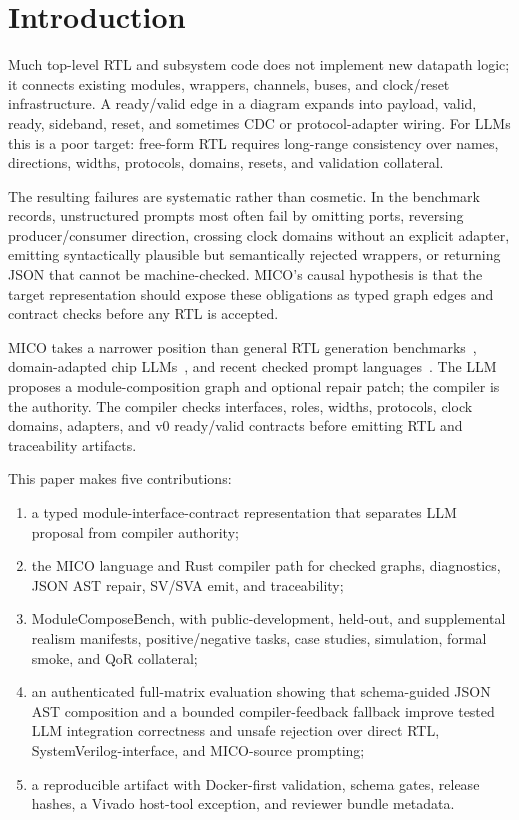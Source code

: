 \section{Introduction}

Much top-level RTL and subsystem code does not implement new datapath logic; it connects existing modules, wrappers, channels, buses, and clock/reset infrastructure. A ready/valid edge in a diagram expands into payload, valid, ready, sideband, reset, and sometimes CDC or protocol-adapter wiring. For LLMs this is a poor target: free-form RTL requires long-range consistency over names, directions, widths, protocols, domains, resets, and validation collateral.

The resulting failures are systematic rather than cosmetic. In the benchmark
records, unstructured prompts most often fail by omitting ports, reversing
producer/consumer direction, crossing clock domains without an explicit
adapter, emitting syntactically plausible but semantically rejected wrappers, or
returning JSON that cannot be machine-checked. MICO's causal hypothesis is that
the target representation should expose these obligations as typed graph edges
and contract checks before any RTL is accepted.

MICO takes a narrower position than general RTL generation benchmarks~\cite{verilogeval2023,rtlcoder2023,openllmrtl2025}, domain-adapted chip LLMs~\cite{chipnemo2023}, and recent checked prompt languages~\cite{cppl2026}. The LLM proposes a module-composition graph and optional repair patch; the compiler is the authority. The compiler checks interfaces, roles, widths, protocols, clock domains, adapters, and v0 ready/valid contracts before emitting RTL and traceability artifacts.

This paper makes five contributions:

\begin{enumerate}
  \item a typed module-interface-contract representation that separates LLM proposal from compiler authority;
  \item the MICO language and Rust compiler path for checked graphs, diagnostics, JSON AST repair, SV/SVA emit, and traceability;
  \item ModuleComposeBench, with public-development, held-out, and supplemental realism manifests, positive/negative tasks, case studies, simulation, formal smoke, and QoR collateral;
  \item an authenticated full-matrix evaluation showing that schema-guided JSON AST composition and a bounded compiler-feedback fallback improve tested LLM integration correctness and unsafe rejection over direct RTL, SystemVerilog-interface, and MICO-source prompting;
  \item a reproducible artifact with Docker-first validation, schema gates, release hashes, a Vivado host-tool exception, and reviewer bundle metadata.
\end{enumerate}

